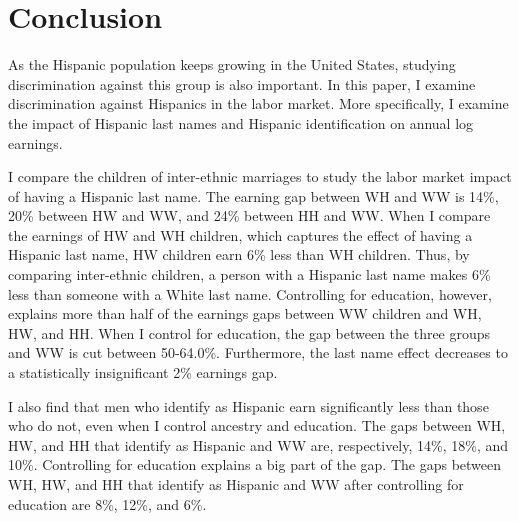 \documentclass{wptemp}
\begin{document}
\section{Conclusion}\label{sec:con}

As the Hispanic population keeps growing in the United States, studying discrimination against this group is also important. In this paper, I examine discrimination against Hispanics in the labor market. More specifically, I examine the impact of Hispanic last names and Hispanic identification on annual log earnings. 

I compare the children of inter-ethnic marriages to study the labor market impact of having a Hispanic last name. The earning gap between WH and WW is 14\%, 20\% between HW and WW, and 24\% between HH and WW. When I compare the earnings of HW and WH children, which captures the effect of having a Hispanic last name, HW children earn  6\% less than WH children. Thus, by comparing inter-ethnic children, a person with a Hispanic last name makes 6\% less than someone with a White last name. Controlling for education, however, explains more than half of the earnings gaps between WW children and WH, HW, and HH. When I control for education, the gap between the three groups and WW is cut between 50-64.0\%. Furthermore, the last name effect decreases to a statistically insignificant 2\% earnings gap.

I also find that men who identify as Hispanic earn significantly less than those who do not, even when I control ancestry and education. The gaps between WH, HW, and HH that identify as Hispanic and WW are, respectively, 14\%, 18\%, and 10\%. Controlling for education explains a big part of the gap. The gaps between WH, HW, and HH that identify as Hispanic and WW after controlling for education are 8\%, 12\%, and 6\%. 
\end{document}
